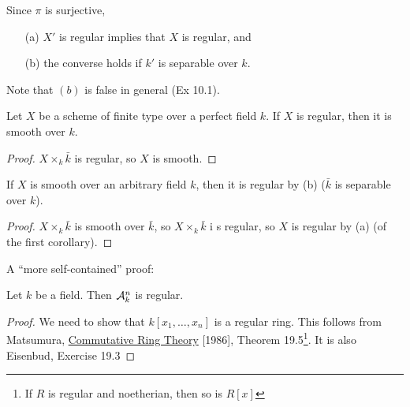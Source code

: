 \begin{corollary}
 Since $\pi$ is surjective,
 \begin{itemize}
 \item[(a)] $X'$ is regular implies that $X$ is
 regular, and
 \item[(b)] the converse holds if $k'$ is separable over $k$.
 \end{itemize} Note that $(b)$ is false in general (Ex 10.1).
 \end{corollary}

 \begin{corollary}
 Let $X$ be a scheme of finite type over a perfect field $k$.  If
 $X$ is regular, then it is smooth over $k$.
 \end{corollary}
 \begin{proof}
 $X\times_k \bar k$ is regular, so $X$ is smooth.
 \end{proof}

 \begin{corollary}
 If $X$ is smooth over an arbitrary field $k$, then it is regular by (b) ($\bar k$
 is separable over $k$).
 \end{corollary}
 \begin{proof}
 $X\times_k \bar k$ is smooth over $\bar k$, so $X\times_k \bar k$
 i s regular, so $X$ is regular by (a) (of the first corollary).
 \end{proof}

 A ``more self-contained'' proof:
 \begin{lemma}
 Let $k$ be a field.  Then $\mathcal{A}^n_k$ is regular.
 \end{lemma}
 \begin{proof}
 We need to show that $k[x_1,\dots, x_n]$ is a regular ring.  This
 follows from Matsumura, \underline{Commutative Ring Theory}
 [1986], Theorem 19.5\footnote{If $R$ is regular and noetherian, then so is
 $R[x]$}.  It is also Eisenbud, Exercise 19.3
 \end{proof}


